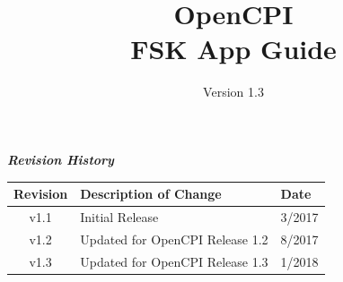 \def\docTitle{OpenCPI\\ FSK App Guide}
\def\docVersion{1.3}

\date{Version \docVersion} %
\title{\docTitle}
\usepackage{graphicx}
\graphicspath{ {figures/} }
\usepackage{textcomp}


\maketitle
\newpage
	\begin{center}
	\textit{\textbf{Revision History}}
		\begin{table}[H]
		\label{table:revisions} %
			\begin{tabularx}{\textwidth}{|c|X|l|}
			\hline
			\rowcolor{blue}
			\textbf{Revision} & \textbf{Description of Change} & \textbf{Date} \\
		    \hline
		    v1.1 & Initial Release & 3/2017 \\
		    \hline
		    v1.2 & Updated for OpenCPI Release 1.2 & 8/2017 \\
			\hline
			v1.3 & Updated for OpenCPI Release 1.3 & 1/2018 \\
			\hline
			\end{tabularx}
		\end{table}
	\end{center}

